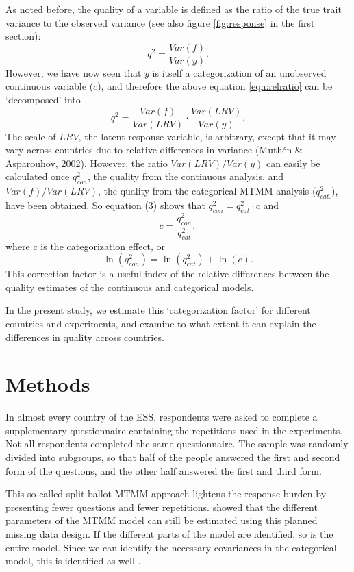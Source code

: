 \documentclass[a4paper,12pt]{article}
\begin{document}
As noted before, the quality of a variable is defined as the ratio of the true trait variance to the observed variance (see also figure \ref{fig:response} in the first section):
\begin{equation}
q^2 = \frac{Var(f)}{Var(y)}.\label{eqn:relratio}
\end{equation}
However, we have now seen that $y$ is itself a categorization of an unobserved continuous variable ($c$), and therefore the above equation \ref{eqn:relratio} can be `decomposed' into
\begin{equation}
q^2 =  \frac{ Var(f)}{Var(LRV)} \cdot \frac{Var(LRV)}{Var(y)}.		
\end{equation}
The scale of $LRV$, the latent response variable, is arbitrary, except that it may vary across countries due to relative differences in variance (Muth\'en \& Asparouhov, 2002). However, the ratio $Var(LRV)/Var(y)$ can easily be calculated once $q^2_{con}$, the quality from the continuous analysis, and $Var(f)/Var(LRV)$, the quality from the categorical MTMM analysis ($q^2_{cat.}$), have been obtained. So equation (3) shows that $q^2_{con} = q^2_{cat} \cdot c$  and 
$$
c = \frac{q^2_{con}} {q^2_{cat}},
$$ 
where c is the categorization effect, or
$$ 
\ln (q^2_{con}) = \ln (q^2_{cat})  + \ln(c).
$$
This correction factor is a useful index of the relative differences between the quality estimates of the continuous and categorical models. 

In the present study, we estimate this `categorization factor' for different countries and experiments, and examine to what extent it can explain the differences in quality across countries. 


\section{Methods}

In almost every country of the ESS, respondents were asked to complete a supplementary questionnaire containing the repetitions used in the experiments. Not all respondents completed the same questionnaire. The sample was randomly divided into subgroups, so that half of the people answered the first and second form of the questions, and the other half answered the first and third form. 

This so-called split-ballot MTMM approach lightens the response burden by presenting fewer questions and fewer repetitions. \citet{saris_new_2004} showed that the different parameters of the MTMM model can still be estimated using this planned missing data design. If the different parts of the model are identified,  so is the entire model. Since we can identify the necessary covariances in the categorical model, this is identified as well  \citep{millsap_assessing_2004}.
\end{document}
